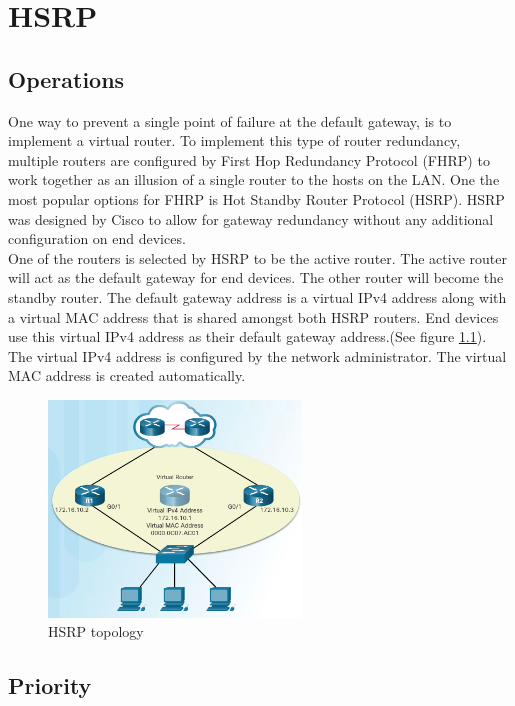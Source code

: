 \chapter{HSRP}

\section{Operations}

One way to prevent a single point of failure at the default gateway, is to implement a virtual router. To implement this type of router redundancy, multiple routers are configured by First Hop Redundancy Protocol (FHRP) to work together as an illusion of a single router to the hosts on the LAN. One the most popular options for FHRP is Hot Standby Router Protocol (HSRP). HSRP was designed by Cisco to allow for gateway redundancy without any additional configuration on end devices.\\
 
One of the routers is selected by HSRP to be the active router. The active router will act as the default gateway for end devices. The other router will become the standby router. The default gateway address is a virtual IPv4 address along with a virtual MAC address that is shared amongst both HSRP routers. End devices use this virtual IPv4 address as their default gateway address.(See figure \ref{HSRP-topology}). The virtual IPv4 address is configured by the network administrator. The virtual MAC address is created automatically.

\begin{figure}[hbtp]
\centering
\includegraphics[width=0.6\textwidth]{pictures/HSRP.png}
\caption{HSRP topology}
\label{HSRP-topology}
\end{figure}

\section{Priority}

